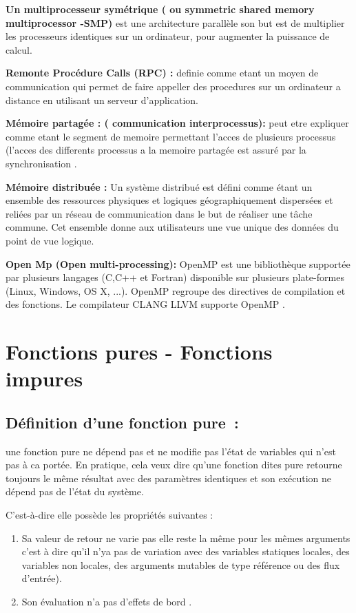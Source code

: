 \documentclass[12pt,titlepage]{article}
\begin{document}
\textbf{ Un multiprocesseur symétrique ( ou symmetric shared memory multiprocessor -SMP) } est une architecture parallèle son but est de multiplier les processeurs identiques sur un ordinateur, pour augmenter la puissance de calcul.

\textbf{ Remonte Procédure Calls (RPC) : } definie comme etant un moyen de communication qui permet de faire appeller des procedures sur un ordinateur a distance en utilisant un serveur d'application.

\textbf{ Mémoire partagée : ( communication interprocessus): }  peut etre expliquer comme etant le segment de memoire permettant l'acces de plusieurs processus (l'acces des differents processus a la memoire partagée est assuré par la synchronisation .

\textbf{ Mémoire distribuée : } Un système distribué est défini comme étant un ensemble des ressources physiques et logiques géographiquement dispersées et reliées par un réseau de communication dans le but de réaliser une tâche commune. Cet ensemble donne aux utilisateurs une vue unique des données du point de vue logique.

\textbf{ Open Mp (Open multi-processing):} OpenMP est une bibliothèque supportée par plusieurs langages (C,C++ et Fortran) disponible sur plusieurs plate-formes (Linux, Windows, OS X, ...). OpenMP regroupe des directives de compilation et des fonctions. Le compilateur CLANG LLVM supporte OpenMP .

\section{Fonctions pures - Fonctions impures}


\subsection{Définition d’une fonction pure :}

une fonction pure ne dépend pas et ne modifie pas l'état de variables qui n'est pas à ca portée.
En pratique, cela veux dire qu'une fonction dites pure retourne toujours le même résultat avec des paramètres identiques et son exécution ne dépend pas de l’état du système.

C'est-à-dire elle possède  les propriétés suivantes  :

\begin{enumerate}
	\item Sa valeur de retour ne varie pas elle reste la même pour les mêmes arguments c'est à dire qu'il n'ya pas de variation avec des variables statiques locales, des variables non locales, des arguments mutables de type référence ou des flux d'entrée).

	\item Son évaluation n'a pas d'effets de bord \cite{definitionfctpure}.
\end{enumerate}
\end{document}

